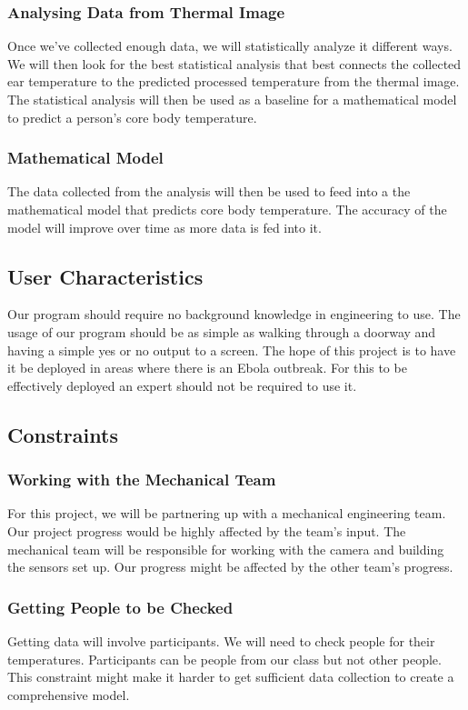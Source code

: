 \documentclass[10pt, draftclsnofoot, onecolumn]{IEEEtran}
\begin{document}
		\subsubsection{Analysing Data from Thermal Image}
		Once we’ve collected enough data, we will statistically analyze it different ways. We will then look for the best statistical analysis that best connects the collected ear temperature to the predicted processed temperature from the thermal image. The statistical analysis will then be used as a baseline for a mathematical model to predict a person’s core body temperature.
		\subsubsection{Mathematical Model}
		The data collected from the analysis will then be used to feed into a the mathematical model that predicts core body temperature. The accuracy of the model will improve over time as more data is fed into it.
	\subsection{User Characteristics}
	Our program should require no background knowledge in engineering to use. The usage of our program should be as simple as walking through a doorway and having a simple yes or no output to a screen. The hope of this project is to have it be deployed in areas where there is an Ebola outbreak. For this to be effectively deployed an expert should not be required to use it.
	\subsection{Constraints}
		\subsubsection{Working with the Mechanical Team}
		For this project, we will be partnering up with a mechanical engineering team. Our project progress would be highly affected by the team’s input. The mechanical team will be responsible for working with the camera and building the sensors set up. Our progress might be affected by the other team’s progress.
		\subsubsection{Getting People to be Checked}
		Getting data will involve participants. We will need to check people for their temperatures. Participants can be people from our class but not other people. This constraint might make it harder to get sufficient data collection to create a comprehensive model.
\end{document}
